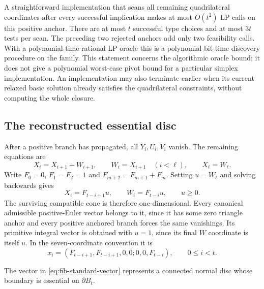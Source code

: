 A straightforward implementation that scans all remaining quadrilateral
coordinates after every successful implication makes at most $O(t^2)$
LP calls on this positive anchor.  There are at most $t$ successful type
choices and at most $3t$ tests per scan.  The preceding two rejected
anchors add only two feasibility calls.  With a polynomial-time rational
LP oracle this is a polynomial bit-time discovery procedure on the
family.  This statement concerns the algorithmic oracle bound; it does
not give a polynomial worst-case pivot bound for a particular simplex
implementation.  An implementation may also terminate earlier when its
current relaxed basic solution already satisfies the quadrilateral
constraints, without computing the whole closure.

\subsection{The reconstructed essential disc}

After a positive branch has propagated, all $Y_i,U_i,V_i$ vanish.  The
remaining equations are
\[
 X_i=X_{i+1}+W_{i+1},\qquad W_i=X_{i+1}\quad(i<\ell),
 \qquad X_\ell=W_\ell.
\]
Write $F_0=0$, $F_1=F_2=1$ and $F_{m+2}=F_{m+1}+F_m$.  Setting
$u=W_\ell$ and solving backwards gives
\begin{equation}
 X_i=F_{t-i+1}u,\qquad W_i=F_{t-i}u,\qquad u\ge0.
 \label{eq:fib-recovered-ray}
\end{equation}
The surviving compatible cone is therefore one-dimensional.  Every
canonical admissible positive-Euler vector belongs to it, since it has
some zero triangle anchor and every positive anchored branch forces the
same vanishings.  Its primitive integral vector is obtained with $u=1$,
since its final $W$ coordinate is
itself $u$.  In the seven-coordinate convention it is
\begin{equation}
 x_i=(F_{t-i+1},F_{t-i+1},0,0;0,0,F_{t-i}),
 \qquad 0\le i<t.
 \label{eq:fib-standard-vector}
\end{equation}

\begin{proposition}
\label{prop:fib-essential-disc}
The vector in \eqref{eq:fib-standard-vector} represents a connected normal
disc whose boundary is essential on $\partial B_t$.
\end{proposition}

